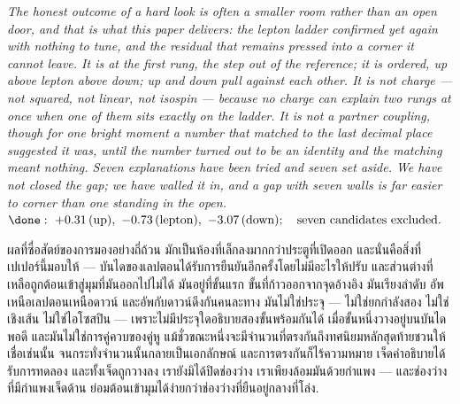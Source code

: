 \documentclass[12pt, a4paper]{article}
\begin{document}
\bigskip
\begin{center}
\textit{%
The honest outcome of a hard look is often a smaller room rather than an open
door, and that is what this paper delivers: the lepton ladder confirmed yet again
with nothing to tune, and the residual that remains pressed into a corner it
cannot leave. It is at the first rung, the step out of the reference; it is
ordered, up above lepton above down; up and down pull against each other. It is
not charge --- not squared, not linear, not isospin --- because no charge can
explain two rungs at once when one of them sits exactly on the ladder. It is not
a partner coupling, though for one bright moment a number that matched to the
last decimal place suggested it was, until the number turned out to be an
identity and the matching meant nothing. Seven explanations have been tried and
seven set aside. We have not closed the gap; we have walled it in, and a gap with
seven walls is far easier to corner than one standing in the open.}\\[0.5em]
$\displaystyle
  \done:\ +0.31\,(\text{up}),\ -0.73\,(\text{lepton}),\ -3.07\,(\text{down});
  \quad \text{seven candidates excluded.}$

\medskip
{\thaifont
ผลที่ซื่อสัตย์ของการมองอย่างถี่ถ้วน มักเป็นห้องที่เล็กลงมากกว่าประตูที่เปิดออก
และนั่นคือสิ่งที่เปเปอร์นี้มอบให้ --- บันไดของเลปตอนได้รับการยืนยันอีกครั้งโดยไม่มีอะไรให้ปรับ
และส่วนต่างที่เหลือถูกต้อนเข้าสู่มุมที่มันออกไปไม่ได้
มันอยู่ที่ขั้นแรก ขั้นที่ก้าวออกจากจุดอ้างอิง มันเรียงลำดับ อัพเหนือเลปตอนเหนือดาวน์ และอัพกับดาวน์ดึงกันคนละทาง
มันไม่ใช่ประจุ --- ไม่ใช่ยกกำลังสอง ไม่ใช่เชิงเส้น ไม่ใช่ไอโซสปิน ---
เพราะไม่มีประจุใดอธิบายสองขั้นพร้อมกันได้ เมื่อขั้นหนึ่งวางอยู่บนบันไดพอดี
และมันไม่ใช่การคู่ควบของคู่หู แม้ชั่วขณะหนึ่งจะมีจำนวนที่ตรงกันถึงทศนิยมหลักสุดท้ายชวนให้เชื่อเช่นนั้น
จนกระทั่งจำนวนนั้นกลายเป็นเอกลักษณ์ และการตรงกันก็ไร้ความหมาย
เจ็ดคำอธิบายได้รับการทดลอง และทั้งเจ็ดถูกวางลง
เรายังมิได้ปิดช่องว่าง เราเพียงล้อมมันด้วยกำแพง --- และช่องว่างที่มีกำแพงเจ็ดด้าน ย่อมต้อนเข้ามุมได้ง่ายกว่าช่องว่างที่ยืนอยู่กลางที่โล่ง.}
\end{center}

\end{document}
